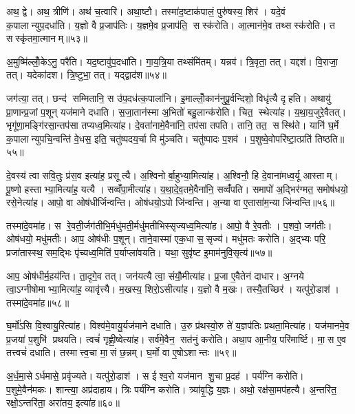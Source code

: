 अथ॒ द्वे। अथ॒ त्रीणि॑। अथ॑ च॒त्वारि॑। अथा॒ष्टौ। तस्मा॑द॒ष्टाक॑पालं॒ पुरु॑षस्य॒ शिर॑। यदे॒वं क॒पालान्युप॒दधा॑ति। य॒ज्ञो वै प्र॒जाप॑तिः। य॒ज्ञमे॒व प्र॒जाप॑ति॒ सस्क॑रोति। आ॒त्मान॑मे॒व तथ्सस्क॑रोति। त सस्कृ॑तमा॒त्मानम्॥५३॥

अ॒मुष्मि॑ल्लोँ॒केऽनु॒ परै॑ति। यद॒ष्टावु॑प॒दधा॑ति। गा॒य॒त्रि॒या तथ्संमि॑तम्। यन्नव॑। त्रि॒वृता॒ तत्। यद्दश॑। वि॒राजा॒ तत्। यदेका॑दश। त्रि॒ष्टुभा॒ तत्। यद्द्वाद॑श॥५४॥

जग॑त्या॒ तत्। छन्द॑ सम्मितानि॒ स उ॑प॒दध॑त्क॒पाला॑नि। इ॒माल्लोँ॒कान॑नुपू॒र्वन्दिशो॒ विधृ॑त्यै दृहति। अथायु॑ प्रा॒णान्प्र॒जां प॒शून् यज॑माने दधाति। स॒जा॒तान॑स्मा अ॒भितो॑ बहु॒लान्क॑रोति। चित॒ स्थेत्या॑ह। य॒था॒य॒जुरे॒वैतत्। भृगू॑णा॒मङ्गि॑रसा॒न्तप॑सा तप्यध्व॒मित्या॑ह। दे॒वता॑नामे॒वैना॑नि॒ तप॑सा तपति। तानि॒ तत॒ सस्थि॑ते। यानि॑ घ॒र्मे क॒पालान्युपचि॒न्वन्ति॑ वे॒धस॒ इति॒ चतु॑ष्पदय॒र्चा वि मु॑ञ्चति। चतु॑ष्पादः प॒शव॑। प॒शुष्वे॒वोपरि॑ष्टा॒त्प्रति॑ तिष्ठति॥५५॥\anuvakamend[व॒र्त॒य॒ति॒ दिव॑मे॒वैतेन॑ दृहति स॒म्भव॑ति॒ त सस्कृ॑तमा॒त्मान॒न्द्वाद॑श॒ सस्थि॑ते॒ त्रीणि॑ च]

दे॒वस्य॑ त्वा सवि॒तुः प्र॑स॒व इत्या॑ह॒ प्रसूत्यै। अ॒श्विनोर्बा॒हुभ्या॒मित्या॑ह। अ॒श्विनौ॒ हि दे॒वाना॑मध्व॒र्यू आस्ताम्। पू॒ष्णो हस्ताभ्या॒मित्या॑ह॒ यत्यै। सव्वँ॑पा॒मीत्या॑ह। य॒था॒दे॒व॒तमे॒वैना॑नि॒ सव्वँ॑पति। समापो॑ अ॒द्भिर॑ग्मत॒ समोष॑धयो॒ रसे॒नेत्या॑ह। आपो॒ वा ओष॑धीर्जिन्वन्ति। ओष॑धयो॒ऽपो जि॑न्वन्ति। अ॒न्या वा ए॒तासा॑म॒न्या जि॑न्वन्ति॥५६॥

तस्मा॑दे॒वमा॑ह। स रे॒वती॒र्जग॑तीभि॒र्मधु॑मती॒र्मधु॑मतीभिस्सृज्यध्व॒मित्या॑ह। आपो॒ वै रे॒वतीः। प॒शवो॒ जग॑तीः। ओष॑धयो॒ मधु॑मतीः। आप॒ ओष॑धीः प॒शून्। ताने॒वास्मा॑ एक॒धा स॒सृज्य॑। मधु॑मतः करोति। अ॒द्भ्यः परि॒ प्रजा॑तास्स्थ॒ सम॒द्भिः पृ॑च्यध्व॒मिति॑ प॒र्याप्ला॑वयति। यथा॒ सुवृ॑ष्ट इ॒माम॑नुवि॒सृत्य॑॥५७॥

आप॒ ओष॑धीर्म॒हय॑न्ति। ता॒दृगे॒व तत्। जन॑यत्यै त्वा॒ संयौ॒मीत्या॑ह। प्र॒जा ए॒वैतेन॑ दाधार। अ॒ग्नये त्वा॒ऽग्नीषोमाभ्या॒मित्या॑ह॒ व्यावृ॑त्त्यै। म॒खस्य॒ शिरो॒ऽसीत्या॑ह। य॒ज्ञो वै म॒खः। तस्यै॒तच्छिर॑। यत्पु॑रो॒डाश॑। तस्मा॑दे॒वमा॑ह॥५८॥

घ॒र्मो॑ऽसि वि॒श्वायु॒रित्या॑ह। विश्व॑मे॒वायु॒र्यज॑माने दधाति। उ॒रु प्र॑थस्वो॒रु ते॑ य॒ज्ञप॑तिः प्रथता॒मित्या॑ह। यज॑मानमे॒व प्र॒जया॑ प॒शुभि॑ प्रथयति। त्वचं॑ गृह्णी॒ष्वेत्या॑ह। सर्व॑मे॒वैन॒ सत॑नुं करोति। अथा॒प आ॒नीय॒ परि॑मार्ष्टि। मा॒स ए॒व तत्त्वचं॑ दधाति। तस्मात्त्व॒चा मा॒सं छ॒न्नम्। घ॒र्मो वा ए॒षोऽशान्तः ॥५९॥

अ॒र्ध॒मा॒सेऽर्धमासे॒ प्रवृ॑ज्यते। यत्पु॑रो॒डाश॑। स ईश्व॒रो यज॑मान शु॒चा प्र॒दह॑। पर्य॑ग्नि करोति। प॒शुमे॒वैन॑मकः। शान्त्या॒ अप्र॑दाहाय। त्रिः पर्य॑ग्नि करोति। त्र्या॑वृ॒द्धि य॒ज्ञः। अथो॒ रक्ष॑सा॒मप॑हत्यै। अ॒न्तरि॑त॒ रक्षो॒ऽन्तरि॑ता॒ अरा॑तय॒ इत्या॑ह॥६०॥

